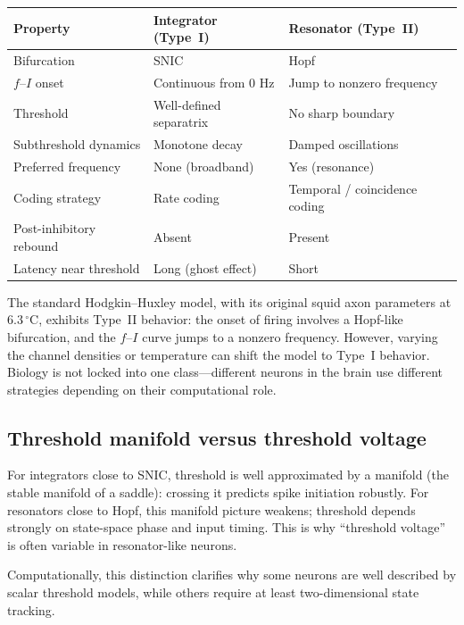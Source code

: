 \begin{center}
\renewcommand{\arraystretch}{1.4}
\begin{tabularx}{\textwidth}{@{}l X X@{}}
  \toprule
  \textbf{Property} & \textbf{Integrator (Type~I)} & \textbf{Resonator (Type~II)} \\
  \midrule
  Bifurcation & SNIC & Hopf \\
  $f$--$I$ onset & Continuous from 0 Hz & Jump to nonzero frequency \\
  Threshold & Well-defined separatrix & No sharp boundary \\
  Subthreshold dynamics & Monotone decay & Damped oscillations \\
  Preferred frequency & None (broadband) & Yes (resonance) \\
  Coding strategy & Rate coding & Temporal / coincidence coding \\
  Post-inhibitory rebound & Absent & Present \\
  Latency near threshold & Long (ghost effect) & Short \\
  \bottomrule
\end{tabularx}
\end{center}

\noindent The standard Hodgkin--Huxley model, with its original squid axon parameters at $6.3\,^\circ\text{C}$, exhibits Type~II behavior: the onset of firing involves a Hopf-like bifurcation, and the $f$--$I$ curve jumps to a nonzero frequency. However, varying the channel densities or temperature can shift the model to Type~I behavior. Biology is not locked into one class---different neurons in the brain use different strategies depending on their computational role.

\subsection{Threshold manifold versus threshold voltage}

For integrators close to SNIC, threshold is well approximated by a manifold (the stable manifold of a saddle): crossing it predicts spike initiation robustly. For resonators close to Hopf, this manifold picture weakens; threshold depends strongly on state-space phase and input timing. This is why ``threshold voltage'' is often variable in resonator-like neurons.

Computationally, this distinction clarifies why some neurons are well described by scalar threshold models, while others require at least two-dimensional state tracking.

